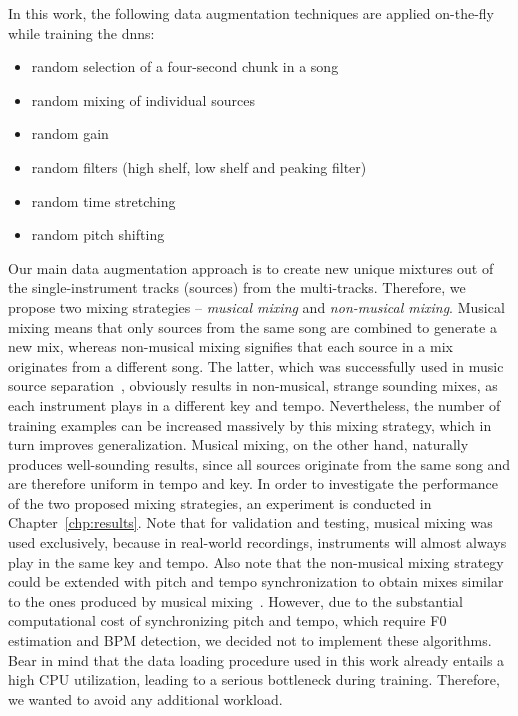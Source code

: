 In this work, the following data augmentation techniques are applied on-the-fly while training the \glspl{dnn}:
\begin{itemize}
	\item random selection of a four-second chunk in a song
	\item random mixing of individual sources
	\item random gain
	\item random filters (high shelf, low shelf and peaking filter)
	\item random time stretching
	\item random pitch shifting
\end{itemize}
Our main data augmentation approach is to create new unique mixtures out of the single-instrument tracks (sources) from the multi-tracks. Therefore, we propose two mixing strategies -- \textit{musical mixing} and \textit{non-musical mixing}. Musical mixing means that only sources from the same song are combined to generate a new mix, whereas non-musical mixing signifies that each source in a mix originates from a different song. The latter, which was successfully used in music source separation~\cite{uhlich2017improving}, obviously results in non-musical, strange sounding mixes, as each instrument plays in a different key and tempo. Nevertheless, the number of training examples can be increased massively by this mixing strategy, which in turn improves generalization. Musical mixing, on the other hand, naturally produces well-sounding results, since all sources originate from the same song and are therefore uniform in tempo and key. In order to investigate the performance of the two proposed mixing strategies, an experiment is conducted in Chapter~\ref{chp:results}. Note that for validation and testing, musical mixing was used exclusively, because in real-world recordings, instruments will almost always play in the same key and tempo. Also note that the non-musical mixing strategy could be extended with pitch and tempo synchronization to obtain mixes similar to the ones produced by musical mixing~\cite{kratimenos2021augmentation}. However, due to the substantial computational cost of synchronizing pitch and tempo, which require F0 estimation and BPM detection, we decided not to implement these algorithms. Bear in mind that the data loading procedure used in this work already entails a high CPU utilization, leading to a serious bottleneck during training. Therefore, we wanted to avoid any additional workload.\\

